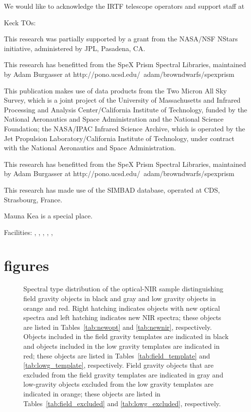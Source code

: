 \documentclass[12pt,preprint]{aastex}
\begin{document}
\acknowledgments
We would like to acknowledge the IRTF telescope operators
and support staff at

Keck TOs:

This research was partially supported by a grant from the NASA/NSF NStars initiative, administered by JPL, Pasadena, CA.

This research has benefitted from the SpeX Prism Spectral Libraries, maintained by Adam Burgasser at http://pono.ucsd.edu/~adam/browndwarfs/spexprism

This publication makes use of data products from the Two Micron All Sky Survey, which is a joint project of the University of Massachusetts and Infrared Processing and Analysis Center/California Institute of Technology, funded by the National Aeronautics and Space Administration and the National Science Foundation; the NASA/IPAC Infrared Science Archive, which is operated by the Jet Propulsion Laboratory/California Institute of Technology, under contract with the National Aeronautics and Space Administration.

This research has benefitted from the SpeX Prism Spectral Libraries, maintained by Adam Burgasser at http://pono.ucsd.edu/~adam/browndwarfs/spexprism

This research has made use of the SIMBAD database, operated at CDS, Strasbourg, France.

Mauna Kea is a special place.

Facilities:
,
,
,
,
,


%


\clearpage
\section{figures}

\begin{figure}
		\caption{Spectral type distribution of the optical-NIR sample distinguishing field gravity objects in black and gray and low gravity objects in orange and red.
		Right hatching indicates objects with new optical spectra and left hatching indicates new NIR spectra; these objects are listed in Tables~\ref{tab:newopt} and \ref{tab:newnir}, respectively.
		Objects included in the field gravity templates are indicated in black and objects included in the low gravity templates are indicated in red; these objects are listed in Tables~\ref{tab:field_template} and \ref{tab:lowg_template}, respectively.
		Field gravity objects that are excluded from the field gravity templates are indicated in gray and low-gravity objects excluded from the low gravity templates are indicated in orange; these objects are listed in Tables~\ref{tab:field_excluded} and \ref{tab:lowg_excluded}, respectively.}
	\label{fig:spthist}
\end{figure}
\end{document}
